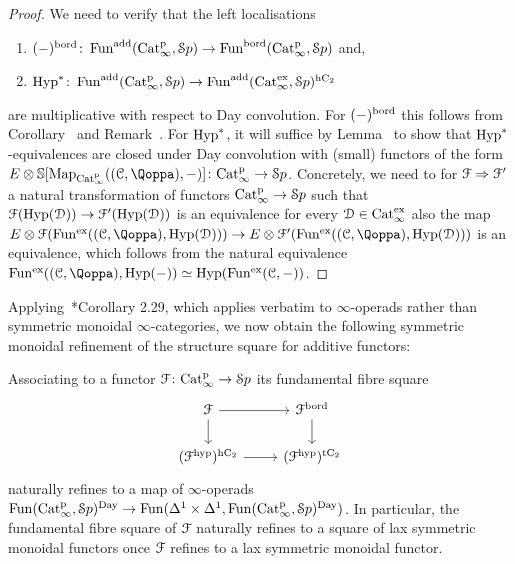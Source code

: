 \begin{proof}
We need to verify that the left localisations 
\begin{enumerate}
\item[-] $(-)^{\mathrm{bord}}\colon \operatorname{Fun}^{\mathrm{add}}(\mathrm{Cat}^{\mathrm p}_\infty,{\mathcal Sp}) \to \operatorname{Fun}^{\mathrm{bord}}(\mathrm{Cat}^{\mathrm p}_\infty,{\mathcal Sp})$ and,
\item[-] $\operatorname{Hyp}^*\colon \operatorname{Fun}^{\mathrm{add}}(\mathrm{Cat}^{\mathrm p}_\infty,{\mathcal Sp}) \to \operatorname{Fun}^{\mathrm{add}}(\mathrm{Cat}_\infty^{\mathrm{ex}},{\mathcal Sp})^{{\mathrm{h}\mathrm{C_2}}}$
\end{enumerate}
are multiplicative with respect to Day convolution. 
For $(-)^{\mathrm{bord}}$ this follows from Corollary~\; and Remark~.
For $\operatorname{Hyp}^*$, it will suffice by Lemma~ to show that $\operatorname{Hyp}^*$-equivalences are closed under Day convolution with (small) functors of the form $E \otimes \SS[\Map_{\Catp}((\C,\QF),-)]\colon \Catp \to \Spa$. Concretely, we need to for $\mathcal{F}\Rightarrow \mathcal{F}'$ a natural transformation of functors $\mathrm{Cat}^{\mathrm p}_\infty \to {\mathcal Sp}$ such that $\mathcal{F}(\operatorname{Hyp}(\mathcal{D})) \to \mathcal{F}'(\operatorname{Hyp}(\mathcal{D}))$ is an equivalence for every $\mathcal{D} \in \mathrm{Cat}_\infty^{\mathrm{ex}}$ also the map $E \otimes \F(\Funx((\C,\QF),\Hyp(\D))) \to E \otimes \F'(\Funx((\C,\QF),\Hyp(\D)))$ is an equivalence, which follows from the natural equivalence 
$\Funx((\C,\QF),\Hyp(-)) \simeq \Hyp(\Funx(\C,-))$.
\end{proof}

Applying~\cite{shah2021recollements}*{Corollary 2.29}, which applies verbatim to $\infty$-operads rather than symmetric monoidal $\infty$-categories, we now obtain the following symmetric monoidal refinement of the structure square for additive functors:

\begin{corollary}
\label{corollary:generic-fracture-monoidal}%
Associating to a functor $\mathcal{F} \colon \mathrm{Cat}^{\mathrm p}_\infty \to {\mathcal Sp}$ 
its fundamental fibre square
\[
\begin{tikzcd}
	\F \ar[r] \ar[d] & \F^\brd \ar[d]   \\
	(\F^\hyp)^{\hC} \ar[r] & (\F^\hyp)^{\tC} 
\end{tikzcd}
\]
naturally refines to a map of $\infty$-operads $\operatorname{Fun}(\mathrm{Cat}^{\mathrm p}_\infty,{\mathcal Sp})^{\mathrm{Day}} \to \operatorname{Fun}(\Delta^1 \times \Delta^1,\operatorname{Fun}(\mathrm{Cat}^{\mathrm p}_\infty,{\mathcal Sp})^{\mathrm{Day}})$. In particular, the fundamental fibre square of $\mathcal{F}$ naturally refines to a square of lax symmetric monoidal functors once $\mathcal{F}$ refines to a lax symmetric monoidal functor.
\end{corollary}



